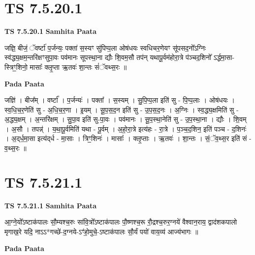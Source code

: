 \documentclass[17pt]{extarticle}
\begin{document}
\section*{ TS 7.5.20.1 }

\textbf{TS 7.5.20.1 } \newline
\textbf{Samhita Paata} \newline

जज्ञि॒ बीजं॒ ॅवर्ष्टा॑ प॒र्जन्यः॒ पक्ता॑ स॒स्यꣳ सु॑पिप्प॒ला ओष॑धयः स्वधिचर॒णेयꣳ सू॑पसद॒नो᳚ऽग्निः स्व॑द्ध्य॒क्षम॒न्तरि॑क्षꣳसुपा॒वः पव॑मानः सूपस्था॒ना द्यौः शि॒वम॒सौ तप॑न् यथापू॒र्वम॑होरा॒त्रे प॑ञ्चद॒शिनो᳚ ऽर्द्धमा॒सा-स्त्रिꣳ॒॒शिनो॒ मासाः᳚ क्लृ॒प्ता ऋ॒तवः॑ शा॒न्तः सं॑ॅवथ्स॒रः ॥ \newline

\textbf{Pada Paata} \newline

जज्ञि॑ । बीज᳚म् । वर्ष्टा᳚ । प॒र्जन्यः॑ । पक्ता᳚ । स॒स्यम् । सु॒पि॒प्प॒ला इति॑ सु - पि॒प्प॒लाः । ओष॑धयः । स्व॒धि॒च॒र॒णेति॑ सु - अ॒धि॒च॒र॒णा । इ॒यम् । सू॒प॒स॒द॒न इति॑ सु - उ॒प॒स॒द॒नः । अ॒ग्निः । स्व॒द्ध्य॒क्षमिति॑ सु - अ॒द्ध्य॒क्षम् । अ॒न्तरि॑क्षम् । सु॒पा॒व इति॑ सु-पा॒वः । पव॑मानः । सू॒प॒स्था॒नेति॑ सु - उ॒प॒स्था॒ना । द्यौः । शि॒वम् । अ॒सौ । तपन्न्॑ । य॒था॒पू॒र्वमिति॑ यथा - पू॒र्वम् । अ॒हो॒रा॒त्रे इत्य॑हः - रा॒त्रे । प॒ञ्च॒द॒शिन॒ इति॑ पञ्च - द॒शिनः॑ । अ॒द्‌र्ध॒मा॒सा इत्य॑द्‌र्ध - मा॒साः । त्रिꣳ॒॒शिनः॑ । मासाः᳚ । क्लृ॒प्ताः । ऋ॒तवः॑ । शा॒न्तः । सं॒ॅव॒थ्स॒र इति॑ सं - व॒थ्स॒रः ॥  \newline




\section*{ TS 7.5.21.1 }

\textbf{TS 7.5.21.1 } \newline
\textbf{Samhita Paata} \newline

आ॒ग्ने॒यो᳚ऽष्टाक॑पालः सौ॒म्यश्च॒रुः सा॑वि॒त्रो᳚ऽष्टाक॑पालः पौ॒ष्णश्च॒रू रौ॒द्रश्च॒रुर॒ग्नये॑ वैश्वान॒राय॒ द्वाद॑शकपालो मृगाख॒रे यदि॒ नाऽऽ*गच्छे॑-द॒ग्नये-ऽꣳ॑हो॒मुचे॒-ऽष्टाक॑पालः सौ॒र्यं पयो॑ वाय॒व्य॑ आज्य॑भागः ॥ \newline

\textbf{Pada Paata} \newline
\end{document}
